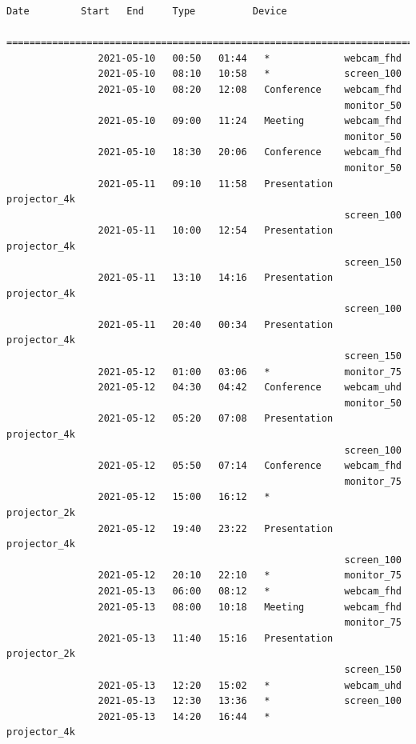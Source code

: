 \documentclass{article}
\begin{document}
\begin{Verbatim}[gobble=8]
                Date         Start   End     Type          Device
                ===========================================================================
                2021-05-10   00:50   01:44   *             webcam_fhd
                2021-05-10   08:10   10:58   *             screen_100
                2021-05-10   08:20   12:08   Conference    webcam_fhd
                                                           monitor_50
                2021-05-10   09:00   11:24   Meeting       webcam_fhd
                                                           monitor_50
                2021-05-10   18:30   20:06   Conference    webcam_fhd
                                                           monitor_50
                2021-05-11   09:10   11:58   Presentation  projector_4k
                                                           screen_100
                2021-05-11   10:00   12:54   Presentation  projector_4k
                                                           screen_150
                2021-05-11   13:10   14:16   Presentation  projector_4k
                                                           screen_100
                2021-05-11   20:40   00:34   Presentation  projector_4k
                                                           screen_150
                2021-05-12   01:00   03:06   *             monitor_75
                2021-05-12   04:30   04:42   Conference    webcam_uhd
                                                           monitor_50
                2021-05-12   05:20   07:08   Presentation  projector_4k
                                                           screen_100
                2021-05-12   05:50   07:14   Conference    webcam_fhd
                                                           monitor_75
                2021-05-12   15:00   16:12   *             projector_2k
                2021-05-12   19:40   23:22   Presentation  projector_4k
                                                           screen_100
                2021-05-12   20:10   22:10   *             monitor_75
                2021-05-13   06:00   08:12   *             webcam_fhd
                2021-05-13   08:00   10:18   Meeting       webcam_fhd
                                                           monitor_75
                2021-05-13   11:40   15:16   Presentation  projector_2k
                                                           screen_150
                2021-05-13   12:20   15:02   *             webcam_uhd
                2021-05-13   12:30   13:36   *             screen_100
                2021-05-13   14:20   16:44   *             projector_4k

\end{Verbatim}
\end{document}
